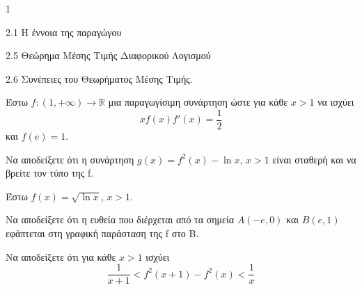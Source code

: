 \begin{ylh}{1}
    \item 2.1 Η έννοια της παραγώγου
    \item 2.5 Θεώρημα Μέσης Τιμής Διαφορικού Λογισμού
    \item 2.6 Συνέπειες του Θεωρήματος Μέσης Τιμής.
\end{ylh}
Έστω $f:(1, +\infty) \to \mathbb{R}$ μια παραγωγίσιμη συνάρτηση ώστε για κάθε $x > 1$ να ισχύει
\[ xf(x)f'(x) = \frac{1}{2} \]
και $f(e)=1$.

\begin{alist}
\item Να αποδείξετε ότι η συνάρτηση $g(x) = f^2(x) - \ln x$, $x > 1$ είναι σταθερή και να βρείτε τον τύπο της f. 
\end{alist}
Έστω $f(x) = \sqrt{\ln x}$, $x > 1$.
\begin{alist}
\item Να αποδείξετε ότι η ευθεία που διέρχεται από τα σημεία $A(-e, 0)$ και $B(e, 1)$ εφάπτεται στη γραφική παράσταση της f στο B. 
\item Να αποδείξετε ότι για κάθε $x > 1$ ισχύει
\[ \frac{1}{x+1} < f^2(x+1) - f^2(x) < \frac{1}{x} \] 
\end{alist}